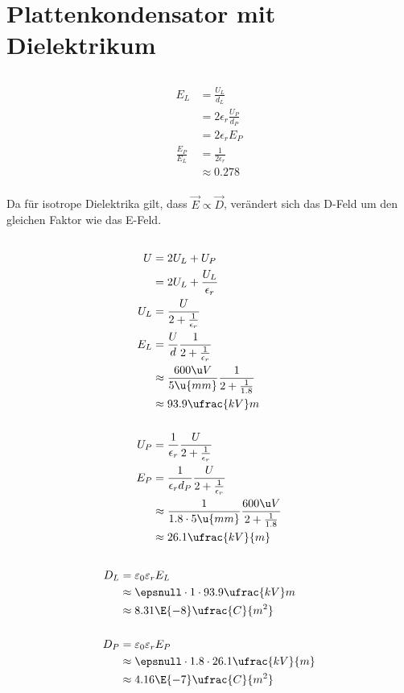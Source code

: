 \documentclass[11pt]{article}
\begin{document}
\section{Plattenkondensator mit Dielektrikum}
\subsection{}
\begin{align*}
    E_L &= \frac{U_L}{d_L}\\
    &= 2\epsilon_r \frac{U_P}{d_P}\\
    &= 2\epsilon_r E_P\\
    \frac{E_P}{E_L} &= \frac{1}{2\epsilon_r}\\
    &\approx 0.278\\
\end{align*}
\begin{adjustwidth}{20pt}{}
    Da für isotrope Dielektrika gilt, dass $\vec E \propto \vec D$, verändert sich 
    das D-Feld um den gleichen Faktor wie das E-Feld.
\end{adjustwidth}

\subsection{}
\begin{align*}
    U &= 2U_L + U_P\\
    &= 2U_L + \frac{U_L}{\epsilon_r}\\
    U_L &= \frac{U}{{2+ \frac1{\epsilon_r}}}\\
    E_L &=  \frac{U}{d}\frac{1}{{2+ \frac1{\epsilon_r}}}\\
    &\approx \frac{600 \u V}{5\u{mm}}\frac{1}{2+ \frac{1}{1.8}}\\
    &\approx 93.9 \ufrac {kV}m\\
    \\
    U_P &= \frac{1}{\epsilon_r}\frac{U}{{2+ \frac1{\epsilon_r}}}\\
    E_P &= \frac{1}{\epsilon_r d_P}\frac{U}{{2+ \frac1{\epsilon_r}}}\\
    &\approx \frac{1}{1.8\cdot 5\u {mm}}\frac{600 \u V}{2+ \frac{1}{1.8}}\\
    &\approx 26.1 \ufrac{kV}{m}
\end{align*}

\subsection{}
\begin{align*}
    D_L &= \varepsilon_0 \varepsilon_r E_L\\
    &\approx \epsnull \cdot 1 \cdot 93.9 \ufrac {kV}m\\
    &\approx 8.31\E{-8}\ufrac{C}{m^2}\\
    \\
    D_P &= \varepsilon_0 \varepsilon_r E_P\\
    &\approx \epsnull \cdot 1.8 \cdot 26.1 \ufrac{kV}{m}\\
    &\approx 4.16\E{-7}\ufrac{C}{m^2}
\end{align*}
\end{document}

